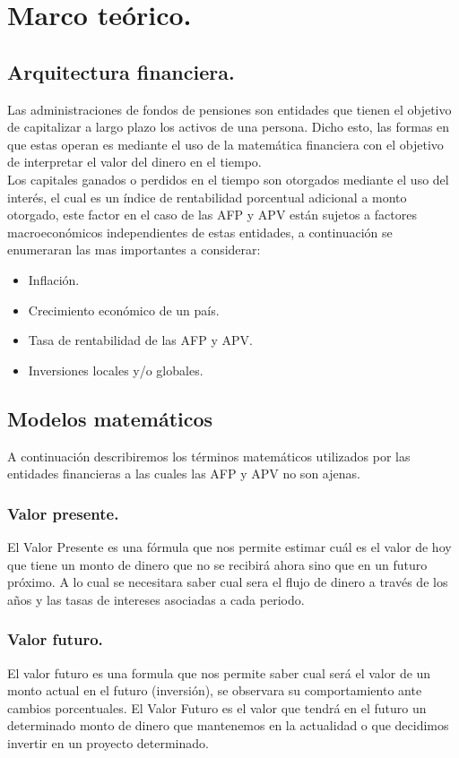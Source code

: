 \documentclass{udpreport}
\begin{document}
\chapter{Marco teórico.}
\section{Arquitectura financiera.}
Las administraciones de fondos de pensiones son entidades que tienen el objetivo de capitalizar a largo plazo los activos de una persona. Dicho esto, las formas en que estas operan es mediante el uso de la matemática financiera con el objetivo de interpretar el valor del dinero en el tiempo.
\\[0.2]
Los capitales ganados o perdidos en el tiempo son otorgados mediante el uso del interés, el cual es un índice de rentabilidad porcentual adicional a monto otorgado, este factor en el caso de las AFP y APV están sujetos a factores macroeconómicos independientes de estas entidades, a continuación se enumeraran las mas importantes a considerar:
\begin{itemize}
    \item Inflación.
    \item Crecimiento económico de un país.
    \item Tasa de rentabilidad de las AFP y APV.
    \item Inversiones locales y/o globales.
\end{itemize}
\section{Modelos matemáticos}
A continuación describiremos los términos matemáticos utilizados por las entidades financieras a las cuales las AFP y APV no son ajenas.
\subsection{Valor presente.}
El Valor Presente es una fórmula que nos permite estimar cuál es el valor de hoy que tiene un monto de dinero que no se recibirá ahora sino que en un futuro próximo. A lo cual se necesitara saber cual sera el flujo de dinero a través de los años y las tasas de intereses asociadas a cada periodo. 
\subsection{Valor futuro.}
El valor futuro es una formula que nos permite saber cual será el valor de un monto actual en el futuro (inversión), se observara su comportamiento ante cambios porcentuales.
El Valor Futuro es el valor que tendrá en el futuro un determinado monto de dinero que mantenemos en la actualidad o que decidimos invertir en un proyecto determinado.
\end{document}
